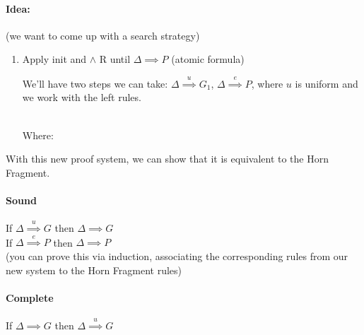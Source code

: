 \documentclass[12 pt]{article}
\begin{document}
       \paragraph{Idea:} (we want to come up with a search strategy)
       \begin{enumerate}
       \item Apply init and $\land$ R until $\Delta \implies P$
         (atomic formula)

         We'll have two steps we can take: $\Delta
         \stackrel{u}{\implies}G_1$, $\Delta \stackrel{e}{\implies}P$,
         where $u$ is uniform and we work with the left rules.

         \begin{center}
           \DP
           \DP
           \\ Where:
           \DP
           \DP
           \DP
         \end{center}
       \end{enumerate}
       With this new proof system, we can show that it is equivalent
       to the Horn Fragment.
       \paragraph{Sound} If $\Delta \stackrel{u}{\implies}G$ then
       $\Delta \implies G$
       \\ If $\Delta \stackrel{e}{\implies} P$ then $\Delta \implies
       P$
       \\ (you can prove this via induction, associating the
       corresponding rules from our new system to the Horn Fragment
       rules)
       \paragraph{Complete} If $\Delta \implies G$ then $\Delta
       \stackrel{u}{\implies} G$
\end{document}
